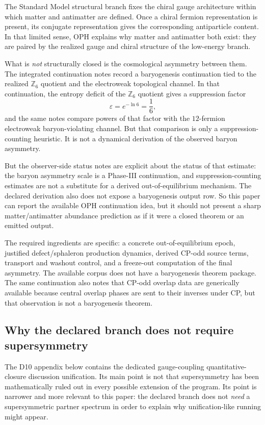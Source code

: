 \documentclass[11pt]{article}
\begin{document}
The Standard Model structural branch fixes the chiral gauge architecture within which
matter and antimatter are defined. Once a chiral fermion representation is present, its conjugate
representation gives the corresponding antiparticle content. In that limited sense, OPH explains
why matter and antimatter both exist: they are paired by the realized gauge and chiral structure
of the low-energy branch.

What is \emph{not} structurally closed is the cosmological asymmetry between them. The
integrated continuation notes record a baryogenesis continuation tied to the realized
\(\mathbb Z_6\) quotient and the electroweak topological channel. In that continuation, the
entropy deficit of the \(\mathbb Z_6\) quotient gives a suppression factor
\[
\varepsilon = e^{-\ln 6} = \frac{1}{6},
\]
and the same notes compare powers of that factor with the \(12\)-fermion electroweak
baryon-violating channel. But that comparison is only a suppression-counting heuristic. It is
not a dynamical derivation of the observed baryon asymmetry.

But the observer-side status notes are explicit about the status of that estimate: the baryon
asymmetry scale is a Phase-III continuation, and suppression-counting estimates are
not a substitute for a derived out-of-equilibrium mechanism. The declared derivation
also does not expose a baryogenesis output row. So this paper can report the
available OPH continuation idea, but it should not present a sharp matter/antimatter abundance
prediction as if it were a closed theorem or an emitted output.

The required ingredients are specific: a concrete out-of-equilibrium epoch, justified
defect/sphaleron production dynamics, derived CP-odd source terms, transport and washout control,
and a freeze-out computation of the final asymmetry. The available
corpus does not have a baryogenesis theorem package. The same continuation also notes that CP-odd
overlap data are generically available because central overlap phases are sent to their inverses
under CP, but that observation is not a baryogenesis theorem.

\subsection{Why the declared branch does not require supersymmetry}

The D10 appendix below contains the dedicated gauge-coupling quantitative-closure discussion
unification. Its main point is not that supersymmetry has been mathematically ruled out in every
possible extension of the program. Its point is narrower and more relevant to this paper: the declared
branch does not \emph{need} a supersymmetric partner spectrum in order to explain why
unification-like running might appear.
\end{document}
